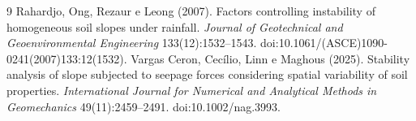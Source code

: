 \documentclass[11pt,a4paper]{article}
\begin{document}
\begin{thebibliography}{9}
 Rahardjo, Ong, Rezaur e Leong (2007). Factors controlling instability of homogeneous soil slopes
under rainfall. \emph{Journal of Geotechnical and Geoenvironmental Engineering} 133(12):1532--1543.
doi:10.1061/(ASCE)1090-0241(2007)133:12(1532).
 Vargas Ceron, Cecílio, Linn e Maghous (2025). Stability analysis of slope subjected to seepage
forces considering spatial variability of soil properties. \emph{International Journal for Numerical and Analytical
Methods in Geomechanics} 49(11):2459--2491. doi:10.1002/nag.3993.
\end{thebibliography}
\end{document}
